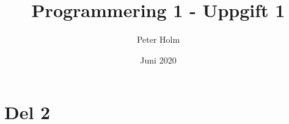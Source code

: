 \documentclass{article}
\title{Programmering 1 - Uppgift 1}
\author{Peter Holm}
\date{Juni 2020}
\begin{document}
\maketitle



\newpage

\section{Del 2}



\newpage





\newpage



\newpage



\newpage


\end{document}
